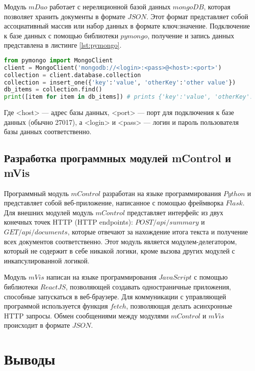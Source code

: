 Модуль $mDao$ работает с нереляционной базой данных $mongoDB$, которая позволяет хранить документы в формате $JSON$. Этот формат представляет собой ассоциативный массив или набор данных в формате ключ:значение. Подключение к базе данных с помощью библиотеки $pymongo$, получение и запись данных представлена в листинге \hyperref[lst:pymongo]{\ref{lst:pymongo}}.

\begin{lstlisting}[language=Python, caption=Работа с базой данных mongoDB с помощью библиотеки pymongo, label=lst:pymongo]
from pymongo import MongoClient
client = MongoClient('mongodb://<login>:<pass>@<host>:<port>')
collection = client.database.collection
collection = insert_one({'key':'value', 'otherKey':'other value'})
db_items = collection.find()
print([item for item in db_items]) # prints {'key':'value', 'otherKey':'other value'}
\end{lstlisting}

Где <host> --- адрес базы данных, <port> --- порт для подключения к базе данных (обычно 27017), а <login> и <pass> --- логин и пароль пользователя базы данных соответственно.

\subsection{Разработка программных модулей mControl и mVis}

Программный модуль $mControl$ разработан на языке программирования $Python$ и представляет собой веб-приложение, написанное с помощью фреймворка $Flask$. Для внешних модулей модуль $mControl$ представляет интерфейс из двух конечных точек HTTP (HTTP endpoints): $POST /api/summary$ и $GET /api/documents$, которые отвечают за нахождение итога текста и получение всех документов соответственно. Этот модуль является модулем-делегатором, который не содержит в себе никакой логики, кроме вызова других модулей с инкапсулированной логикой.

Модуль $mVis$ написан на языке программирования $JavaScript$ с помощью библиотеки $ReactJS$, позволяющей создавать одностраничные приложения, способные запускаться в веб-браузере. Для коммуникации с управляющей программой используется функция $fetch$, позволяющая делать асинхронные HTTP запросы. Обмен сообщениями между модулями $mControl$ и $mVis$ происходит в формате $JSON$.

\section{Выводы}

